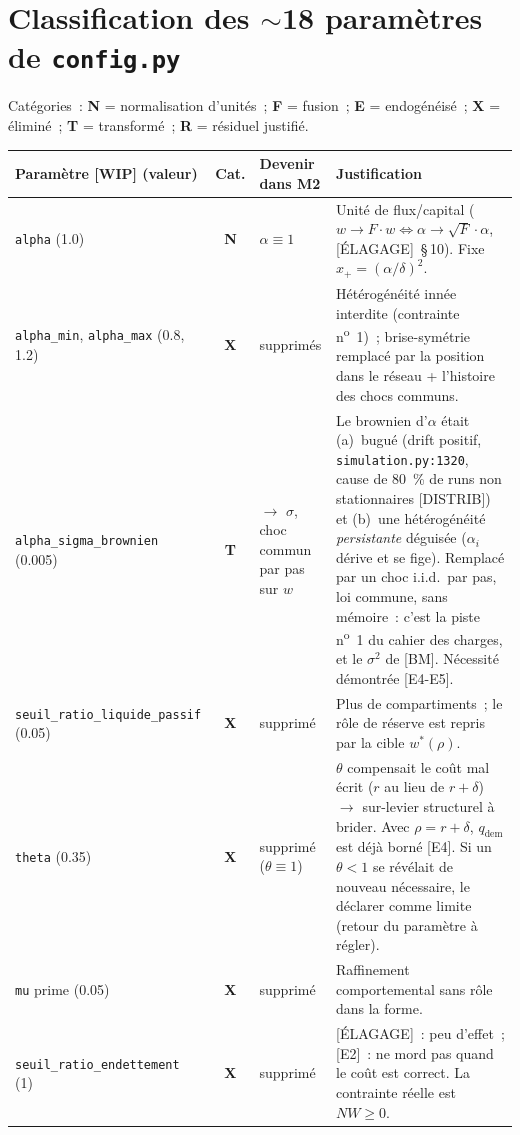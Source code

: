 \documentclass[11pt,a4paper]{article}
\newcommand{\NW}{\mathit{NW}}
\begin{document}
\section{Classification des \texorpdfstring{$\sim$18}{~18} paramètres de \texttt{config.py}}
\label{sec:parametres}

Catégories~: \textbf{N} = normalisation d'unités~; \textbf{F} = fusion~; \textbf{E} = endogénéisé~; \textbf{X} = éliminé~; \textbf{T} = transformé~; \textbf{R} = résiduel justifié.

\begin{xltabular}{\linewidth}{@{}>{\raggedright\arraybackslash}p{3.1cm}c>{\raggedright\arraybackslash}p{2.7cm}X@{}}
\toprule
Paramètre [WIP] (valeur) & Cat. & Devenir dans M2 & Justification \\
\midrule
\endhead
\texttt{alpha} (1.0) & \textbf{N} & $\alpha\equiv 1$ & Unité de flux/capital ($w\to F\cdot w \iff \alpha\to\sqrt F\cdot\alpha$, [ÉLAGAGE]~\S\,10). Fixe $x_+=(\alpha/\delta)^2$. \\
\texttt{alpha_min}, \texttt{alpha_max} (0.8, 1.2) & \textbf{X} & supprimés & Hétérogénéité innée interdite (contrainte n\textsuperscript{o}~1)~; brise-symétrie remplacé par la position dans le réseau + l'histoire des chocs communs. \\
\texttt{alpha_sigma_brownien} (0.005) & \textbf{T} & $\to$ $\sigma$, choc commun par pas sur $w$ & Le brownien d'$\alpha$ était (a)~bugué (drift positif, \texttt{simulation.py:1320}, cause de 80~\% de runs non stationnaires [DISTRIB]) et (b)~une hétérogénéité \emph{persistante} déguisée ($\alpha_i$ dérive et se fige). Remplacé par un choc i.i.d.\ par pas, loi commune, sans mémoire~: c'est la piste n\textsuperscript{o}~1 du cahier des charges, et le $\sigma^2$ de [BM]. Nécessité démontrée [E4-E5]. \\
\texttt{seuil_ratio_liquide_passif} (0.05) & \textbf{X} & supprimé & Plus de compartiments~; le rôle de réserve est repris par la cible $w^*(\rho)$. \\
\texttt{theta} (0.35) & \textbf{X} & supprimé ($\theta\equiv 1$) & $\theta$ compensait le coût mal écrit ($r$ au lieu de $r+\delta$) $\to$ sur-levier structurel à brider. Avec $\rho=r+\delta$, $q_{\mathrm{dem}}$ est déjà borné [E4]. Si un $\theta<1$ se révélait de nouveau nécessaire, le déclarer comme limite (retour du paramètre à régler). \\
\texttt{mu} prime (0.05) & \textbf{X} & supprimé & Raffinement comportemental sans rôle dans la forme. \\
\texttt{seuil_ratio_endettement} (1) & \textbf{X} & supprimé & [ÉLAGAGE]~: peu d'effet~; [E2]~: ne mord pas quand le coût est correct. La contrainte réelle est $\NW\geq 0$. \\

\end{xltabular}
\end{document}
